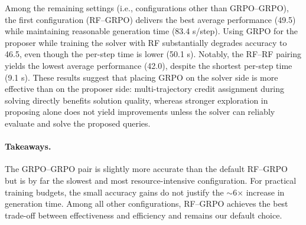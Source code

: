 \documentclass[10pt, a4paper, logo]{googledeepmind} %
\begin{document}
Among the remaining settings (i.e., configurations other than GRPO--GRPO), the first configuration (RF--GRPO) delivers the best average performance (49.5) while maintaining reasonable generation time (83.4 s/step). Using GRPO for the proposer while training the solver with RF substantially degrades accuracy to 46.5, even though the per-step time is lower (50.1 s). Notably, the RF--RF pairing yields the lowest average performance (42.0), despite the shortest per-step time (9.1 s). These results suggest that placing GRPO on the solver side is more effective than on the proposer side: multi-trajectory credit assignment during solving directly benefits solution quality, whereas stronger exploration in proposing alone does not yield improvements unless the solver can reliably evaluate and solve the proposed queries.

\paragraph{Takeaways.} The GRPO--GRPO pair is slightly more accurate than the default RF--GRPO but is by far the slowest and most resource-intensive configuration. For practical training budgets, the small accuracy gains do not justify the $\sim$6$\times$ increase in generation time. Among all other configurations, RF--GRPO achieves the best trade-off between effectiveness and efficiency and remains our default choice.

\begin{table}[t]
\caption{Evaluation results and rollout generation time comparisons on different RL algorithms for proposers and solvers, where RF denotes REINFORCE.}
\label{tab:ablation_RL_algo}
\centering
{}
\end{table}
\end{document}
